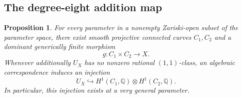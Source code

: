 \documentclass[11pt]{amsart}
\newcommand{\Q}{\mathbb Q}
\newtheorem{proposition}[theorem]{Proposition}
\theoremstyle{definition}
\theoremstyle{remark}
\numberwithin{equation}{section}
\begin{document}
\subsection{The degree-eight addition map}

\begin{proposition}\label{geom:domination}
For every parameter in a nonempty Zariski-open subset of the
parameter space, there exist smooth projective connected curves
$C_1,C_2$ and a dominant generically finite morphism
\[
 g:C_1\times C_2\longrightarrow X.
\]
Whenever additionally $U_X$ has no nonzero rational $(1,1)$-class,
an algebraic correspondence induces an injection
\[
 U_X\hookrightarrow H^1(C_1,\Q)\otimes H^1(C_2,\Q).
\]
In particular, this injection exists at a very general parameter.
\end{proposition}
\end{document}
